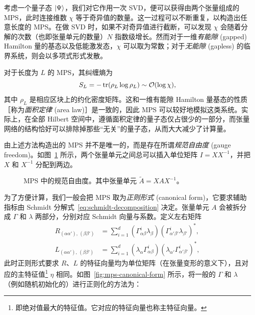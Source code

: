 考虑一个量子态 $\ket{\Psi}$，我们对它作用一次 SVD，便可以获得由两个张量组成的 MPS，此时连接维数 $\chi$ 等于奇异值的数量。这一过程可以不断重复，以构造出任意长度的 MPS。在做 SVD 时，如果不对奇异值进行截断，可以发现 $\chi$ 会随着分解的次数（也即张量单元的数量）$N$ 指数级增长。然而对于一维\emph{有能隙} (gapped) Hamilton 量的基态以及低能激发态，$\chi$ 可以取为常数；对于\emph{无能隙} (gapless) 的临界系统，则会以多项式形式发散。

对于长度为 $L$ 的 MPS，其纠缠熵为
\begin{equation}
  S_L = -\operatorname{tr}(\rho_L\log\rho_L) \sim \mathcal{O}(\log\chi),
\end{equation}
其中 $\rho_L$ 是相应区块上的约化密度矩阵。这和一维有能隙 Hamilton 量基态的性质［称为\emph{面积定律} (area law)］是一致的，因此 MPS 可以较好地模拟这类系统。实际上，在全部 Hilbert 空间中，遵循面积定律的量子态仅占很少的一部分，而张量网络的结构恰好可以排除掉那些“无关”的量子态，从而大大减少了计算量。

由上述方法构造出的 MPS 并不是唯一的，而是存在所谓\emph{规范自由度} (gauge freedom)\cite{bridgeman2017hand}。如图~\ref{fig:mps-gauge-freedom} 所示，两个张量单元之间总可以插入单位矩阵 $I=XX^{-1}$，并把 $X$ 和 $X^{-1}$ 分配到两边。

\begin{figure}[htb]
  \centering
  \caption[MPS 中的规范自由度]{MPS 中的规范自由度。其中张量单元 $\tilde{A}=XAX^{-1}$。}
  \label{fig:mps-gauge-freedom}
\end{figure}

为了方便计算，我们一般会把 MPS 取为\emph{正则形式} (canonical form)\cite{orus2008infinite,schollwock2011density,orus2014practical}，它要求辅助指标由 Schmidt 分解式~\eqref{eq:schmidt-decomposition} 决定。张量单元 $A$ 会被拆分成 $\Gamma$ 和 $\lambda$ 两部分，分别对应 Schmidt 向量与系数。定义左右矩阵
\begin{equation}
  \begin{aligned}
       R_{(\alpha\alpha'), \, (\beta\beta')}
    &= \sum_{i=1}^d \left( \Gamma^i_{\alpha\beta} \lambda_\beta \right) \left( \Gamma^i_{\alpha'\beta'} \lambda_{\beta'} \right)^*, \\
       L_{(\alpha\alpha'), \, (\beta\beta')}
    &= \sum_{i=1}^d \left( \lambda_\alpha \Gamma^i_{\alpha\beta} \right) \left( \lambda_{\alpha'} \Gamma^i_{\alpha'\beta'} \right)^*,
  \end{aligned}
\end{equation}
此时正则形式要求 $R$、$L$ 的特征向量均为单位矩阵（在张量变形的意义下），且对应的主特征值\footnote{即绝对值最大的特征值。它对应的特征向量也称主特征向量。} $\eta$ 相同。如图~\ref{fig:mps-canonical-form} 所示，将一般的 $\Gamma$ 和 $\lambda$（例如随机初始化的）进行正则化的方法为：

